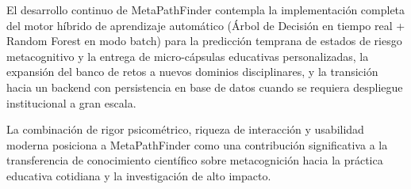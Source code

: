 \documentclass[11pt,a4paper]{article}
\begin{document}
El desarrollo continuo de MetaPathFinder contempla la implementación completa del motor híbrido de aprendizaje automático (Árbol de Decisión en tiempo real + Random Forest en modo batch) para la predicción temprana de estados de riesgo metacognitivo y la entrega de micro-cápsulas educativas personalizadas, la expansión del banco de retos a nuevos dominios disciplinares, y la transición hacia un backend con persistencia en base de datos cuando se requiera despliegue institucional a gran escala.

La combinación de rigor psicométrico, riqueza de interacción y usabilidad moderna posiciona a MetaPathFinder como una contribución significativa a la transferencia de conocimiento científico sobre metacognición hacia la práctica educativa cotidiana y la investigación de alto impacto.
\end{document}

